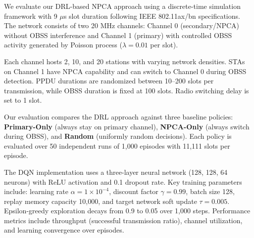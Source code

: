 \documentclass[conference]{IEEEtran}
\begin{document}
We evaluate our DRL-based NPCA approach using a discrete-time simulation framework with 9 $\mu$s slot duration following IEEE 802.11ax/bn specifications. The network consists of two 20 MHz channels: Channel 0 (secondary/NPCA) without OBSS interference and Channel 1 (primary) with controlled OBSS activity generated by Poisson process ($\lambda = 0.01$ per slot).

Each channel hosts 2, 10, and 20 stations with varying network densities. STAs on Channel 1 have NPCA capability and can switch to Channel 0 during OBSS detection. PPDU durations are randomized between 10--200 slots per transmission, while OBSS duration is fixed at 100 slots. Radio switching delay is set to 1 slot.

Our evaluation compares the DRL approach against three baseline policies: \textbf{Primary-Only} (always stay on primary channel), \textbf{NPCA-Only} (always switch during OBSS), and \textbf{Random} (uniformly random decisions). Each policy is evaluated over 50 independent runs of 1,000 episodes with 11,111 slots per episode.

The DQN implementation uses a three-layer neural network (128, 128, 64 neurons) with ReLU activation and 0.1 dropout rate. Key training parameters include: learning rate $\alpha = 1 \times 10^{-4}$, discount factor $\gamma = 0.99$, batch size 128, replay memory capacity 10,000, and target network soft update $\tau = 0.005$. Epsilon-greedy exploration decays from 0.9 to 0.05 over 1,000 steps. Performance metrics include throughput (successful transmission ratio), channel utilization, and learning convergence over episodes.
\end{document}
